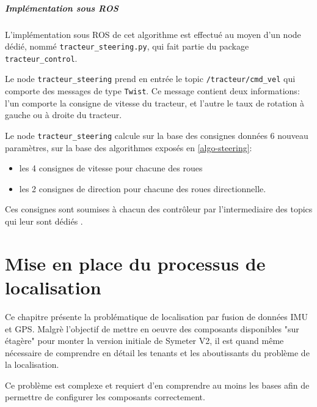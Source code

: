 \documentclass[12pt,a4paper]{report}
\begin{document}
			
			\paragraph{Implémentation sous ROS}
			
			L'implémentation sous ROS de cet algorithme est effectué au moyen d'un node dédié, nommé \verb|tracteur_steering.py|, qui fait partie du package \verb|tracteur_control|.
			
			\para Le node \verb|tracteur_steering| prend en entrée le topic \verb|/tracteur/cmd_vel| qui comporte des messages de type \verb|Twist|. Ce message contient deux informations: l'un comporte la consigne de vitesse du tracteur, et l'autre le taux de rotation à gauche ou à droite du tracteur.
			
			\para Le node \verb|tracteur_steering| calcule sur la base des consignes données 6 nouveau paramètres, sur la base des algorithmes exposés en \ref{algo-steering}:
			\begin{itemize}
				\item les 4 consignes de vitesse pour chacune des roues
				\item les 2 consignes de direction pour chacune des roues directionnelle.
			\end{itemize}
		
			\para Ces consignes sont soumises à chacun des contrôleur par l'intermediaire des topics qui leur sont dédiés .
			
			
		
		
		

\chapter{Mise en place du processus de localisation}

Ce chapitre présente la problématique de localisation par fusion de données IMU et GPS. Malgrè l'objectif de mettre en oeuvre des composants disponibles "sur étagère" pour monter la version initiale de Symeter V2, il est quand même nécessaire de comprendre en détail les tenants et les aboutissants du problème de la localisation.

\para Ce problème est complexe et requiert d'en comprendre au moins les bases afin de permettre de configurer les composants correctement.
\end{document}
